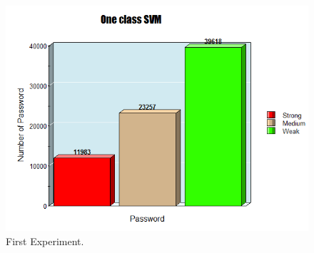 \documentclass[runningheads]{llncs}
\begin{document}
{{\begin{figure}
\begin{minipage}[b]{0.4\textwidth}
  \begin{mdframed}
    \includegraphics[width=\textwidth]{First.png}
   \end{mdframed}
    \caption{First Experiment.}
  
  \end{minipage}
  

\end{figure}}}
\end{document}
